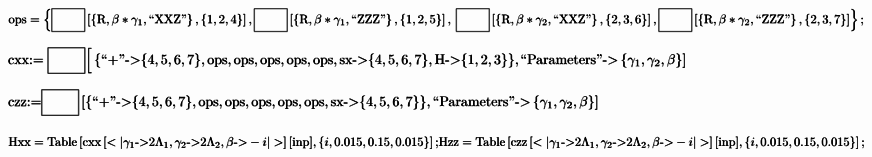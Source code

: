 \documentclass{article}
\begin{document}
\begin{doublespace}
\noindent\(\pmb{\text{ops} = \left\{\fbox{$
\begin{array}{cc}
  &  \\
\end{array}
$}\left[\left\{\text{R},\beta *\gamma _1,\text{{``}XXZ{''}}\right\},\{1,2,4\}\right],\fbox{$
\begin{array}{cc}
  &  \\
\end{array}
$}\left[\left\{\text{R},\beta *\gamma _1,\text{{``}ZZZ{''}}\right\},\{1,2,5\}\right], \right.}\\
\pmb{\left.\fbox{$
\begin{array}{cc}
  &  \\
\end{array}
$}\left[\left\{\text{R},\beta *\gamma _2,\text{{``}XXZ{''}}\right\},\{2,3,6\}\right],\fbox{$
\begin{array}{cc}
  &  \\
\end{array}
$}\left[\left\{\text{R},\beta *\gamma _2,\text{{``}ZZZ{''}}\right\},\{2,3,7\}\right]\right\};}\)
\end{doublespace}

\begin{doublespace}
\noindent\(\pmb{\text{cxx}\text{:=}\left.\fbox{$
\begin{array}{cc}
  &  \\
\end{array}
$}\right[\{\text{{``}+{''}}\text{-$>$}\{4,5,6,7\},\text{ops},\text{ops},\text{ops},\text{ops},\text{ops},\text{sx}\text{-$>$}\{4,5,6,7\},\text{H}\text{-$>$}\{1,2,3\}\},
}\\
\pmb{\left.\text{{``}Parameters{''}}\text{-$>$}\left\{\gamma _1,\gamma _2,\beta \right\}\right]}\)
\end{doublespace}

\begin{doublespace}
\noindent\(\pmb{\text{czz}\text{:=}\fbox{$
\begin{array}{cc}
  &  \\
\end{array}
$}\left[\{\text{{``}+{''}}\text{-$>$}\{4,5,6,7\},\text{ops},\text{ops},\text{ops},\text{ops},\text{ops},\text{sx}\text{-$>$}\{4,5,6,7\}\},\text{{``}Parameters{''}}\text{-$>$}\left\{\gamma
_1,\gamma _2,\beta \right\}\right]}\)
\end{doublespace}

\begin{doublespace}
\noindent\(\pmb{\text{Hxx} = \text{Table}\left[\text{cxx}\left[<|\gamma _1\text{-$>$}2\Lambda _1,\gamma _2\text{-$>$}2\Lambda _2,\beta \text{-$>$}-i|>\right][\text{inp}],\{i,0.015,0.15,0.015\}\right];}\\
\pmb{\text{Hzz} = \text{Table}\left[\text{czz}\left[<|\gamma _1\text{-$>$}2\Lambda _1,\gamma _2\text{-$>$}2\Lambda _2,\beta \text{-$>$}-i|>\right][\text{inp}],\{i,0.015,0.15,0.015\}\right];}\)
\end{doublespace}
\end{document}
